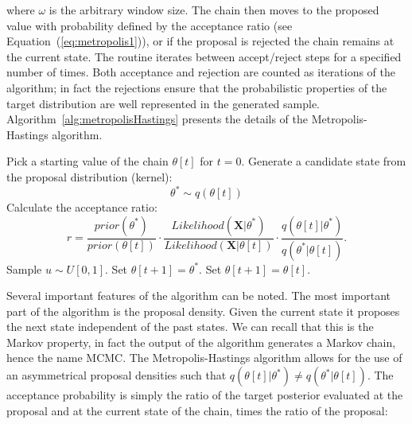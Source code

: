 \noindent
where $\omega$ is the arbitrary window size.
The chain then moves to the proposed value with probability defined by the acceptance ratio (see Equation~(\ref{eq:metropolis1})), or if the proposal is rejected the chain remains at the current state.
The routine iterates between accept/reject steps for a specified number of times.
Both acceptance and rejection are counted as iterations of the algorithm; in fact the rejections ensure that the probabilistic properties of the target distribution are well represented in the generated sample.  
Algorithm~\ref{alg:metropolisHastings} presents the details of the Metropolis-Hastings algorithm.

\begin{algorithm}[H]
\centering
\begin{algorithmic}[1]
%
\State Pick a starting value of the chain $\theta \left[ t \right]$ for $t=0$.
%
%
\State Generate a candidate state from the proposal distribution (kernel):
$$\theta^{*} \sim q(\theta[t])$$
%
\State Calculate the acceptance ratio:
$$r=\frac{prior\left(\theta^{*}\right)}{prior\left(\theta\left[t\right]\right)}\cdot\frac{Likelihood\left(\mathbf{X}|\theta^{*}\right)}{Likelihood\left(\mathbf{X}|\theta\left[t\right]\right)}\cdot\frac{q\left(\theta\left[t\right]|\theta^{*}\right)}{q\left(\theta^{*}|\theta\left[t\right]\right)}.$$
%
\State Sample $u\sim U[0,1]$.
%
%
\State Set $\theta[t+1]=\theta^*.$
%
\Else 
%
\State Set $\theta[t+1]=\theta[t].$
%
\EndIf
%
\EndFor
\end{algorithmic}
\caption{
{ \footnotesize 
{\bf The Metropolis-Hastings algorithm} 
}%
}
\label{alg:metropolisHastings}
\end{algorithm}

Several important features of the algorithm can be noted.
The most important part of the algorithm is the proposal density. 
Given the current state it proposes the next state independent of the past states.
We can recall that this is the Markov property, in fact the output of the algorithm generates a Markov chain, hence the name MCMC.
The Metropolis-Hastings algorithm allows for the use of an asymmetrical proposal densities such that $q\left(\theta\left[t\right]|\theta^{*}\right)\neq q\left(\theta^{*}|\theta\left[t\right]\right)$.
The acceptance probability is simply the ratio of the target posterior evaluated at the proposal and at the current state of the chain, times the ratio of the proposal: 

